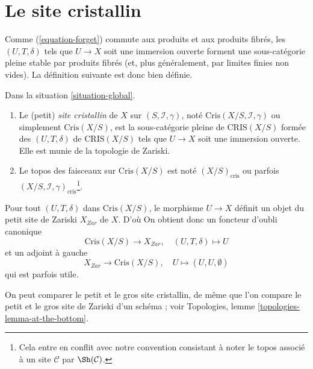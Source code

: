 \section{Le site cristallin}
\label{section-site}

\noindent
Comme (\ref{equation-forget}) commute aux produits et aux produits
fibrés, les $(U, T, \delta)$ tels que
$U \to X$ soit une immersion ouverte forment une
sous-catégorie pleine stable par produits fibrés (et, plus généralement,
par limites finies non vides). La
définition suivante est donc bien définie.

\begin{definition}
\label{definition-crystalline-site}
Dans la situation \ref{situation-global}.
\begin{enumerate}
\item Le (petit) {\it site cristallin} de $X$ sur
$(S, \mathcal{I}, \gamma)$, noté $\text{Cris}(X/S, \mathcal{I}, \gamma)$
ou simplement $\text{Cris}(X/S)$, est la sous-catégorie pleine de $\text{CRIS}(X/S)$
formée des $(U, T, \delta)$ de $\text{CRIS}(X/S)$ tels que
$U \to X$ soit une immersion ouverte. Elle est munie de la topologie de Zariski.
\item Le topos des faisceaux sur $\text{Cris}(X/S)$ est noté
$(X/S)_{\text{cris}}$ ou parfois
$(X/S, \mathcal{I}, \gamma)_{\text{cris}}$\footnote{Cela entre en conflit avec
notre convention consistant à noter le topos associé à un site $\mathcal{C}$
par $\Sh(\mathcal{C})$.}.
\end{enumerate}
\end{definition}

\noindent
Pour tout $(U, T, \delta)$ dans $\text{Cris}(X/S)$, le morphisme $U \to X$
définit un objet du petit site de Zariski $X_{Zar}$ de $X$. D'où
On obtient donc un foncteur d'oubli canonique
\begin{equation}
\label{equation-forget-small}
\text{Cris}(X/S) \longrightarrow X_{Zar},\quad
(U, T, \delta) \longmapsto U
\end{equation}
et un adjoint à gauche
\begin{equation}
\label{equation-endow-trivial-small}
X_{Zar} \longrightarrow \text{Cris}(X/S),\quad
U \longmapsto (U, U, \emptyset)
\end{equation}
qui est parfois utile.

\medskip\noindent
On peut comparer le petit et le gros site cristallin, de même
que l'on compare le petit et le gros site de Zariski d'un schéma ; voir
Topologies, lemme \ref{topologies-lemma-at-the-bottom}.

